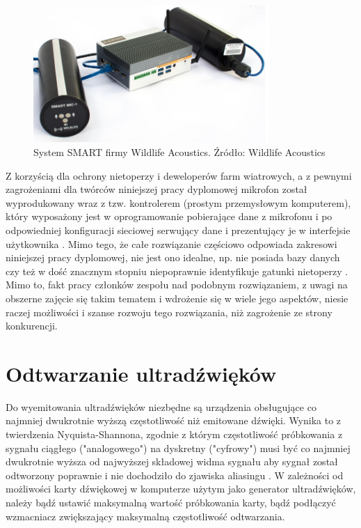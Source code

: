 \documentclass{sprz}
\begin{document}
\begin{figure}[h]
  \centering
  \includegraphics[width=0.8\textwidth]{sprz/smart.png}
  \caption{System SMART firmy Wildlife Acoustics. Źródło: Wildlife Acoustics}
  \label{img:smart}
\end{figure} 

Z korzyścią dla ochrony nietoperzy i deweloperów farm wiatrowych, a z pewnymi zagrożeniami dla twórców niniejszej pracy dyplomowej mikrofon został wyprodukowany wraz z tzw. kontrolerem (prostym przemysłowym komputerem), który wyposażony jest w oprogramowanie pobierające dane z mikrofonu i po odpowiedniej konfiguracji sieciowej serwujący dane i prezentujący je w interfejsie użytkownika \cite{smart-user-guide}. Mimo tego, że całe rozwiązanie częściowo odpowiada zakresowi niniejszej pracy dyplomowej, nie jest ono idealne, np. nie posiada bazy danych czy też w dość znacznym stopniu niepoprawnie identyfikuje gatunki nietoperzy \cite{kaleidoscope-bias}. Mimo to, fakt pracy członków zespołu nad podobnym rozwiązaniem, z uwagi na obszerne zajęcie się takim tematem i wdrożenie się w wiele jego aspektów, niesie raczej możliwości i szanse rozwoju tego rozwiązania, niż zagrożenie ze strony konkurencji.

\section{Odtwarzanie ultradźwięków}
Do wyemitowania ultradźwięków niezbędne są urządzenia obsługujące co najmniej dwukrotnie wyższą częstotliwość niż emitowane dźwięki. Wynika to z twierdzenia Nyquista-Shannona, zgodnie z którym częstotliwość próbkowania z sygnału ciągłego ("analogowego") na dyskretny ("cyfrowy") musi być co najmniej dwukrotnie wyższa od najwyższej składowej widma sygnału aby sygnał został odtworzony poprawnie i nie dochodziło do zjawiska aliasingu \cite{probkowanie}. W zależności od możliwości karty dźwiękowej w komputerze użytym jako generator ultradźwięków, należy bądź ustawić maksymalną wartość próbkowania karty, bądź podłączyć wzmacniacz zwiększający maksymalną częstotliwość odtwarzania.
\end{document}
